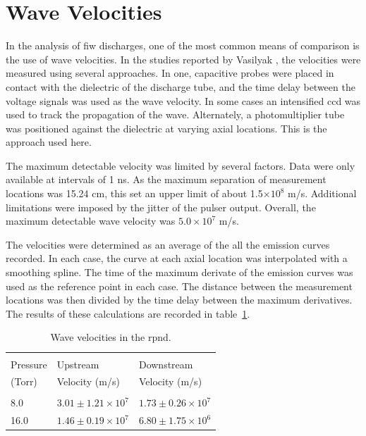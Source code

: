 \section{Wave Velocities}

In the analysis of \acs{fiw} discharges, one of the most common means of
comparison is the use of wave velocities. In the studies reported by Vasilyak
\cite{Vasilyak1994}, the velocities were measured using several approaches. In
one, capacitive probes were placed in contact with the dielectric of the
discharge tube, and the time delay between the voltage signals was used as the
wave velocity. In some cases an intensified \acs{ccd} was used to track the
propagation of the wave. Alternately, a photomultiplier tube was positioned
against the dielectric at varying axial locations. This is the approach used
here.

The maximum detectable velocity was limited by several factors. Data were only
available at intervals of 1 ns. As the maximum separation of measurement
locations was 15.24 cm, this set an upper limit of about 1.5$\times10^8$ m/s.
Additional limitations were imposed by the jitter of the pulser output. Overall,
the maximum detectable wave velocity was $5.0\times10^7$ m/s.

The velocities were determined as an average of the all the emission curves
recorded. In each case, the curve at each axial location was interpolated with a
smoothing spline. The time of the maximum derivate of the emission curves was
used as the reference point in each case. The distance between the measurement
locations was then divided by the time delay between the maximum derivatives.
The results of these calculations are recorded in table~\ref{tbl:velocities}.
\begin{table}
  \centering
  \caption{Wave velocities in the \acs{rpnd}.}
  \label{tbl:velocities}
  \begin{tabular}{lll}
    \toprule                                                      \\
    Pressure  & Upstream                & Downstream              \\
    (Torr)    & Velocity (m/s)          & Velocity (m/s)          \\
    \midrule                                                      \\
    8.0       & $3.01\pm1.21\times10^7$ & $1.73\pm0.26\times10^7$ \\
    16.0      & $1.46\pm0.19\times10^7$ & $6.80\pm1.75\times10^6$ \\
  \end{tabular}
\end{table}

